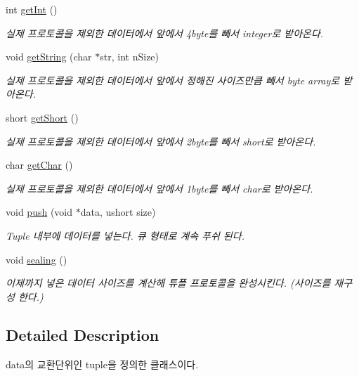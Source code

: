 \begin{DoxyCompactItemize}
int \hyperlink{classTUPLE_a7acd2309510ebffdb18f017305d19eae}{get\+Int} ()
\begin{DoxyCompactList}\small\item\em 실제 프로토콜을 제외한 데이터에서 앞에서 4byte를 빼서 integer로 받아온다. \end{DoxyCompactList}\item 
void \hyperlink{classTUPLE_aa63aa375cc37d317e7285ee981633bf4}{get\+String} (char $\ast$str, int n\+Size)
\begin{DoxyCompactList}\small\item\em 실제 프로토콜을 제외한 데이터에서 앞에서 정해진 사이즈만큼 빼서 byte array로 받아온다. \end{DoxyCompactList}\item 
short \hyperlink{classTUPLE_a823b939e5468a2eed9a5aa0f8b146386}{get\+Short} ()
\begin{DoxyCompactList}\small\item\em 실제 프로토콜을 제외한 데이터에서 앞에서 2byte를 빼서 short로 받아온다. \end{DoxyCompactList}\item 
char \hyperlink{classTUPLE_a043493af57989a416ea5720ac33f1c4b}{get\+Char} ()
\begin{DoxyCompactList}\small\item\em 실제 프로토콜을 제외한 데이터에서 앞에서 1byte를 빼서 char로 받아온다. \end{DoxyCompactList}\item 
void \hyperlink{classTUPLE_a79848defdc0abc394db4df16eeab7c91}{push} (void $\ast$data, ushort size)
\begin{DoxyCompactList}\small\item\em Tuple 내부에 데이터를 넣는다. 큐 형태로 계속 푸쉬 된다. \end{DoxyCompactList}\item 
void \hyperlink{classTUPLE_a4e13d79b8a856ada3ecd1a21fec500f2}{sealing} ()
\begin{DoxyCompactList}\small\item\em 이제까지 넣은 데이터 사이즈를 계산해 튜플 프로토콜을 완성시킨다. (사이즈를 재구성 한다.) \end{DoxyCompactList}\end{DoxyCompactItemize}


\subsection{Detailed Description}
data의 교환단위인 tuple을 정의한 클래스이다. 

